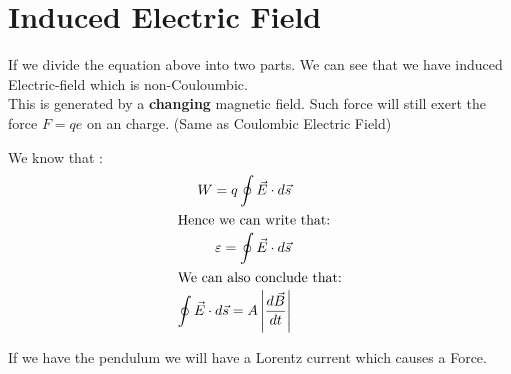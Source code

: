 \documentclass[12pt]{article}
\numberwithin{equation}{section}
\begin{document}
\section{Induced Electric Field}
If we divide the equation above into two parts. We can see that we have induced Electric-field which is non-Couloumbic. \\
This is generated by a \textbf{changing} magnetic field. Such force will still exert the force $F=qe$ on an charge. (Same as Coulombic Electric Field)

We know that :
\begin{align}
W=q \oint\vec{E}\cdot d \vec{s} \\
\intertext{Hence we can write that:}
\varepsilon= \oint \vec{E}\cdot d \vec{s} \\
\intertext{We can also conclude that:}
\oint \vec{E}\cdot d \vec{s} = A \left|\frac{d\vec{B}}{dt} \right| \\
\end{align}

If we have the pendulum we will have a Lorentz current which causes a Force.
\end{document}
